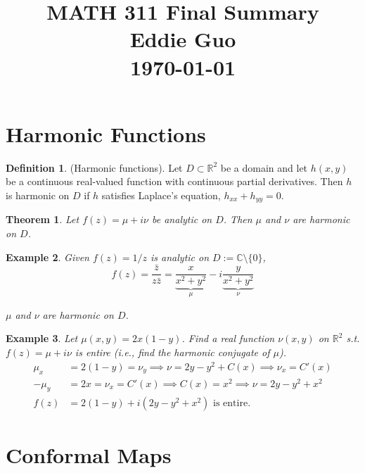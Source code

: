 \documentclass{article}
\title{\LARGE MATH 311 Final Summary \\[1em] \normalsize Eddie Guo \\ \today}
\author{}
\date{}
\newtheorem{theorem}{Theorem}[section]
\newtheorem{example}[theorem]{Example}
\theoremstyle{definition}
\newtheorem{definition}{Definition}[section]
\begin{document}
\maketitle

\section{Harmonic Functions}

\begin{definition}
    (Harmonic functions). Let $D \subset \mathbb{R}^2$ be a domain and let $h(x, y)$ be a continuous real-valued function with continuous partial derivatives. Then $h$ is harmonic on $D$ if $h$ satisfies Laplace's equation, $h_{xx} + h_{yy} = 0$.
\end{definition}

\begin{theorem}
    Let $f(z) = \mu + i \nu$ be analytic on $D$. Then $\mu$ and $\nu$ are harmonic on $D$.
\end{theorem}

\begin{example} \normalfont
    Given $f(z) = 1/z$ is analytic on $D := \mathbb{C} \setminus \{0\}$,
    \begin{equation*}
        f(z) = \frac{\bar{z}}{z \bar{z}} = \underbrace{\frac{x}{x^2+y^2}}_\mu - i \underbrace{\frac{y}{x^2+y^2}}_\nu
    \end{equation*} \vspace{-2em}

    $\mu$ and $\nu$ are harmonic on $D$.
\end{example}

\begin{example} \normalfont
    Let $\mu(x, y) = 2x(1-y)$. Find a real function $\nu(x, y)$ on $\mathbb{R}^2$ s.t. $f(z) = \mu + i \nu$ is entire (i.e., find the harmonic conjugate of $\mu$).
    \begin{align*}
        \mu_x &= 2(1-y) = \nu_y \implies \nu = 2y-y^2 + C(x) \implies \nu_x = C'(x) \\
        -\mu_y &= 2x = \nu_x = C'(x) \implies C(x) = x^2 \implies \nu = 2y-y^2+x^2 \\
        f(z) &= 2(1-y) + i (2y -y^2 + x^2) \text{ is entire.}
    \end{align*}
\end{example}


\section{Conformal Maps}
\end{document}

